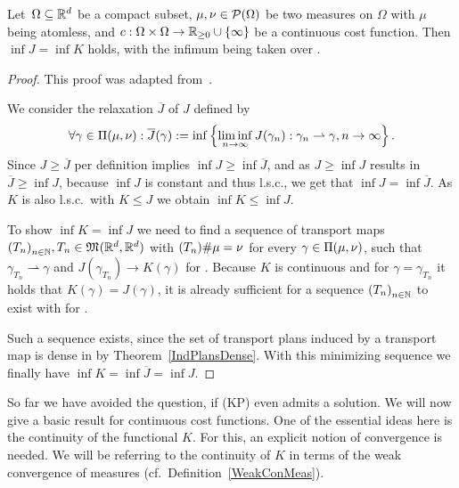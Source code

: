 \begin{theorem}\label{InfCoincide}
	Let $\,\Omega \subseteq \R^d$ be a compact subset, $\mu, \nu \in \PM{\Omega}$ be two measures on $\Omega$ with $\mu$ being atomless, and $\map[c]{\Omega \times \Omega}{\RZero \cup \{ \infty \}}$ be a continuous cost function. Then $\inf J = \inf K$ holds, with the infimum being taken over \TP{\mu}{\nu}.
\end{theorem}

\begin{proof}
	This proof was adapted from\ \cite[the proof of Theorem~1.33 and the memo on relaxations, Box~1.10]{San2015}.

	We consider the relaxation $\overline{J}$ of $J$ defined by
	\[ \forall \gamma \in \TP{\mu}{\nu}: \overline{J}(\gamma) := \inf \left\{ \liminf\limits_{\Ninf} J(\gamma_n) : \weak{\gamma_n}{\gamma}, \Ninf \right\}. \]
	Since $J \ge \overline{J}$ per definition implies $\inf J \ge \inf \overline{J}$, and as $J \ge \inf J$ results in $\overline{J} \ge \inf J$, because $\inf J$ is constant and thus l.s.c., we get that $\inf J = \inf \overline{J}$. As $K$ is also l.s.c.\ with $K \le J$ we obtain $\inf K \le \inf J$.

	To show $\inf K = \inf J$ we need to find a sequence of transport maps ${(T_n)}_{\NinN}, T_n \in \MF{\R^d}{\R^d}$ with $\push[(T_n)]{\mu} = \nu$ for every $\gamma \in \TP{\mu}{\nu}$, such that $\gamma_{T_n} \rightharpoonup \gamma$ and $J(\gamma_{T_n}) \rightarrow K(\gamma)$ for \Ninf. Because $K$ is continuous and for $\gamma = \gamma_{T_n}$ it holds that $K(\gamma) = J(\gamma)$, it is already sufficient for a sequence ${(T_n)}_{\NinN}$ to exist with  for \Ninf.

	Such a sequence exists, since the set of transport plans induced by a transport map is dense in \TP{\mu}{\nu} by Theorem~\ref{IndPlansDense}. With this minimizing sequence we finally have $\inf K = \inf \overline{J} = \inf J$.
\end{proof}

So far we have avoided the question, if (KP) even admits a solution. We will now give a basic result for continuous cost functions. One of the essential ideas here is the continuity of the functional $K$. For this, an explicit notion of convergence is needed. We will be referring to the continuity of $K$ in terms of the weak convergence of measures (cf.\ Definition~\ref{WeakConMeas}).

